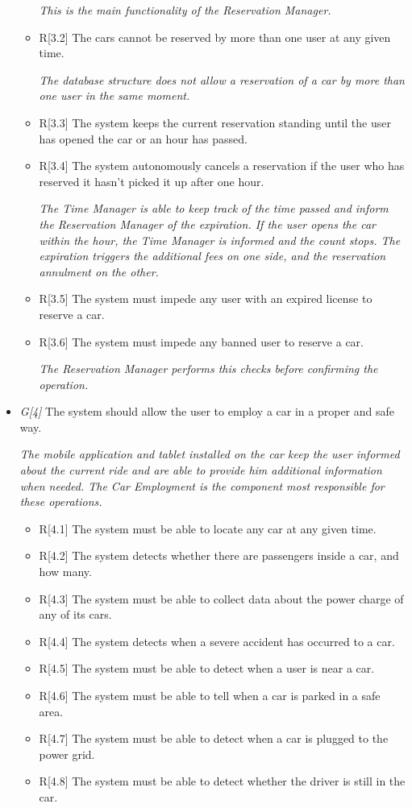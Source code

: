 \begin{itemize}
\begin{itemize}
			\textit{This is the main functionality of the Reservation Manager.}
		
		\item R[3.2] The cars cannot be reserved by more than one user at any given time.

			\textit{The database structure does not allow a reservation of a car by more than one user in the same moment.}

		\item R[3.3] The system keeps the current reservation standing until the user has opened the car or an hour has passed.
		\item R[3.4] The system autonomously cancels a reservation if the user who has reserved it hasn't picked it up after one hour.

			\textit{The Time Manager is able to keep track of the time passed and inform the Reservation Manager of the expiration. If the user opens the car within the hour, the Time Manager is informed and the count stops. The expiration triggers the additional fees on one side, and the reservation annulment on the other.}

		\item R[3.5] The system must impede any user with an expired license to reserve a car.
		\item R[3.6] The system must impede any banned user to reserve a car.

			\textit{The Reservation Manager performs this checks before confirming the operation.}
	\end{itemize}

\item \textit{G[4]} The system should allow the user to employ a car in a proper and safe way. 

	\textit{The mobile application and tablet installed on the car keep the user informed about the current ride and are able to provide him additional information when needed. The Car Employment is the component most responsible for these operations.}

	\begin{itemize}
		\item R[4.1] The system must be able to locate any car at any given time. 
		\item R[4.2] The system detects whether there are passengers inside a car, and how many.
		\item R[4.3] The system must be able to collect data about the power charge of any of its cars.
		\item R[4.4] The system detects when a severe accident has occurred to a car.
		\item R[4.5] The system must be able to detect when a user is near a car.
		\item R[4.6] The system must be able to tell when a car is parked in a safe area.
		\item R[4.7] The system must be able to detect when a car is plugged to the power grid.
		\item R[4.8] The system must be able to detect whether the driver is still in the car.


\end{itemize}
\end{itemize}
